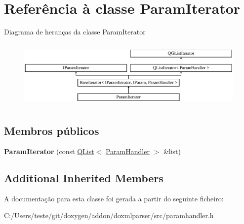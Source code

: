 \hypertarget{class_param_iterator}{\section{Referência à classe Param\-Iterator}
\label{class_param_iterator}
}
Diagrama de heranças da classe Param\-Iterator\begin{figure}[H]
\begin{center}
\leavevmode
\includegraphics[height=3.404255cm]{class_param_iterator}
\end{center}
\end{figure}
\subsection*{Membros públicos}
\begin{DoxyCompactItemize}
\item 
\hypertarget{class_param_iterator_ac1edd817fb2dd49a7a469f27724dfb84}{{\bfseries Param\-Iterator} (const \hyperlink{class_q_list}{Q\-List}$<$ \hyperlink{class_param_handler}{Param\-Handler} $>$ \&list)}\label{class_param_iterator_ac1edd817fb2dd49a7a469f27724dfb84}

\end{DoxyCompactItemize}
\subsection*{Additional Inherited Members}


A documentação para esta classe foi gerada a partir do seguinte ficheiro\-:\begin{DoxyCompactItemize}
\item 
C\-:/\-Users/teste/git/doxygen/addon/doxmlparser/src/paramhandler.\-h\end{DoxyCompactItemize}
